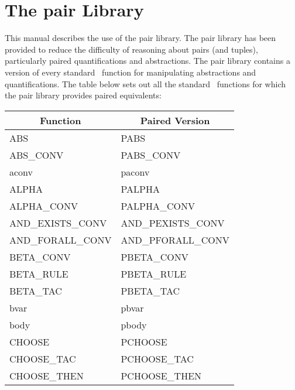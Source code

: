 \chapter{The pair Library}

This manual describes the use of the pair library.
The pair library has been provided to reduce the difficulty of reasoning
about pairs (and tuples), particularly paired quantifications and abstractions.
The pair library contains a version of every standard \HOL\ function
for manipulating abstractions and quantifications.
The table below sets out all the standard \HOL\ functions for which the
pair library provides paired equivalents:
{\tiny \begin{center}
    \begin{tabular}[t]{|l|l|}                                           \hline
        \multicolumn{1}{|c|}{\normalsize Function}
    &   \multicolumn{1}{|c|}{\normalsize Paired Version}\\              \hline
        ABS                         &   PABS                        \\
        ABS\_CONV                   &   PABS\_CONV                  \\
        aconv                       &   paconv                      \\
        ALPHA                       &   PALPHA                      \\
        ALPHA\_CONV                 &   PALPHA\_CONV                \\
        AND\_EXISTS\_CONV           &   AND\_PEXISTS\_CONV          \\
        AND\_FORALL\_CONV           &   AND\_PFORALL\_CONV          \\
        BETA\_CONV                  &   PBETA\_CONV                 \\
        BETA\_RULE                  &   PBETA\_RULE                 \\
        BETA\_TAC                   &   PBETA\_TAC                  \\
        bvar                        &   pbvar                       \\
        body                        &   pbody                       \\
        CHOOSE                      &   PCHOOSE                     \\
        CHOOSE\_TAC                 &   PCHOOSE\_TAC                \\
        CHOOSE\_THEN                &   PCHOOSE\_THEN               \\

\end{tabular}
\end{center}}
